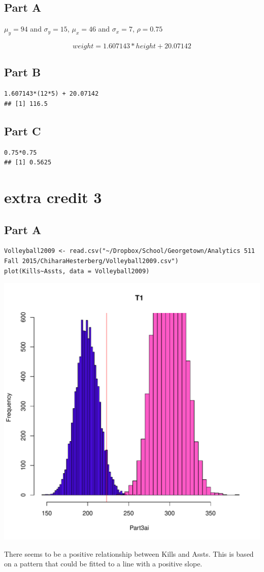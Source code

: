 \documentclass{article}\usepackage[]{graphicx}\usepackage[]{color}
\makeatletter
\newenvironment{kframe}{%
 \def\at@end@of@kframe{}%
 \ifinner\ifhmode%
  \def\at@end@of@kframe{\end{minipage}}%
  \begin{minipage}{\columnwidth}%
 \fi\fi%
 \def\FrameCommand##1{\hskip\@totalleftmargin \hskip-\fboxsep
 \colorbox{shadecolor}{##1}\hskip-\fboxsep
     \hskip-\linewidth \hskip-\@totalleftmargin \hskip\columnwidth}%
 \MakeFramed {\advance\hsize-\width
   \@totalleftmargin\z@ \linewidth\hsize
   \@setminipage}}%
 {\par\unskip\endMakeFramed%
 \at@end@of@kframe}
\newenvironment{knitrout}{}{} %
\makeatother
\begin{document}
\subsection*{Part A}
$\mu_{y}=94$ and $\sigma_{y}=15$, $\mu_{x}=46$ and $\sigma_{x}=7$, $\rho = 0.75$

\begin{equation}
weight = 1.607143*height + 20.07142
\end{equation}
\subsection*{Part B}
\begin{knitrout}
\color{fgcolor}\begin{kframe}
\begin{verbatim}
1.607143*(12*5) + 20.07142
## [1] 116.5
\end{verbatim}
\end{kframe}
\end{knitrout}
\subsection*{Part C}
\begin{knitrout}
\color{fgcolor}\begin{kframe}
\begin{verbatim}
0.75*0.75
## [1] 0.5625
\end{verbatim}
\end{kframe}
\end{knitrout}
\section*{extra credit 3}
\subsection*{Part A}
\begin{knitrout}
\color{fgcolor}\begin{kframe}
\begin{verbatim}
Volleyball2009 <- read.csv("~/Dropbox/School/Georgetown/Analytics 511 Fall 2015/ChiharaHesterberg/Volleyball2009.csv")
plot(Kills~Assts, data = Volleyball2009)
\end{verbatim}
\end{kframe}
\includegraphics[width=0.33\linewidth]{figure/unnamed-chunk-8-1} 

\end{knitrout}
There seems to be a positive relationship between Kills and Assts. This is based on a pattern that could be fitted to a line with a positive slope.
\end{document}
